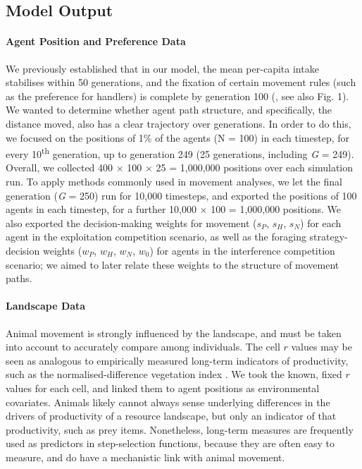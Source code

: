    \subsection*{Model Output}
    
    \paragraph*{Agent Position and Preference Data}
    
    We previously established that in our model, the mean per-capita intake stabilises within 50 generations, and the fixation of certain movement rules (such as the preference for handlers) is complete by generation 100 (\citealt{gupte2021a}, see also Fig. 1).
    We wanted to determine whether agent path structure, and specifically, the distance moved, also has a clear trajectory over generations.
    In order to do this, we focused on the positions of 1\% of the agents (N = 100) in each timestep, for every 10\textsuperscript{th} generation, up to generation 249 (25 generations, including \textit{G} = 249).
    Overall, we collected 400 $\times$ 100 $\times$ 25 = 1,000,000 positions over each simulation run.
    To apply methods commonly used in movement analyses, we let the final generation (\textit{G} = 250) run for 10,000 timesteps, and exported the positions of 100 agents in each timestep, for a further 10,000 $\times$ 100 = 1,000,000 positions.
    We also exported the decision-making weights for movement ($s_P$, $s_H$, $s_N$) for each agent in the exploitation competition scenario, as well as the foraging strategy-decision weights ($w_P$, $w_H$, $w_N$, $w_0$) for agents in the interference competition scenario; we aimed to later relate these weights to the structure of movement paths.
    
    \paragraph*{Landscape Data}
    
    Animal movement is strongly influenced by the landscape, and must be taken into account to accurately compare among individuals.
    The cell $r$ values may be seen as analogous to empirically measured long-term indicators of productivity, such as the normalised-difference vegetation index \citep[NDVI;][]{pettorelli2011}.
    We took the known, fixed $r$ values for each cell, and linked them to agent positions as environmental covariates.
    Animals likely cannot always sense underlying differences in the drivers of productivity of a resource landscape, but only an indicator of that productivity, such as prey items.
    Nonetheless, long-term measures are frequently used as predictors in step-selection functions, because they are often easy to measure, and do have a mechanistic link with animal movement.
    
